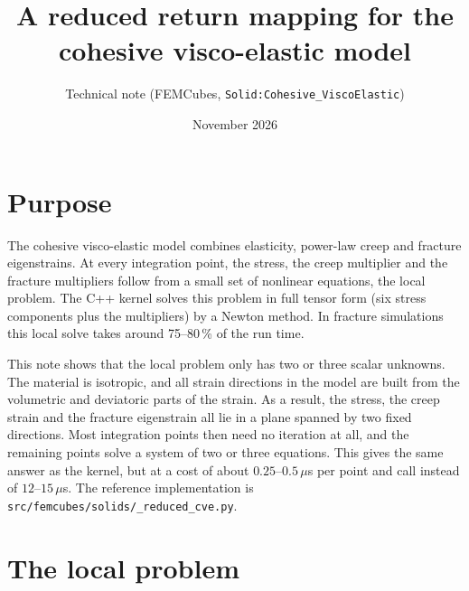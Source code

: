 \documentclass[11pt,a4paper]{article}
\title{A reduced return mapping for the cohesive visco-elastic model}
\author{Technical note (FEMCubes, \texttt{Solid:Cohesive\_ViscoElastic})}
\date{November 2026}
\begin{document}
\maketitle

\section{Purpose}

The cohesive visco-elastic model combines elasticity, power-law creep and fracture eigenstrains.
At every integration point, the stress, the creep multiplier and the fracture multipliers follow
from a small set of nonlinear equations, the local problem. The C++ kernel solves this problem
in full tensor form (six stress components plus the multipliers) by a Newton method. In fracture
simulations this local solve takes around 75--80\,\% of the run time.

This note shows that the local problem only has two or three scalar unknowns. The material is
isotropic, and all strain directions in the model are built from the volumetric and deviatoric
parts of the strain. As a result, the stress, the creep strain and the fracture eigenstrain all
lie in a plane spanned by two fixed directions. Most integration points then need no iteration
at all, and the remaining points solve a system of two or three equations. This gives the same
answer as the kernel, but at a cost of about $0.25$--$0.5\,\mu$s per point and call instead of
$12$--$15\,\mu$s. The reference implementation is \texttt{src/femcubes/solids/\_reduced\_cve.py}.

\section{The local problem}
\end{document}
